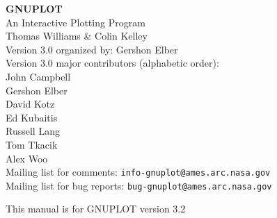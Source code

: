 %
%
\setlength{\textwidth}{6.25in}
\setlength{\oddsidemargin}{0.5cm}
\setlength{\topmargin}{-0.5in}
\setlength{\textheight}{9in}
\setlength{\parskip}{1ex}
\setlength{\parindent}{0pt}
\adjustarticle


\pagestyle{empty}
   \rule{0in}{3in}
   \begin{center}
   {\huge\bf GNUPLOT}\\
   \vspace{3ex}
   {\Large An Interactive Plotting Program}\\
   \vspace{2ex}
   \large
   Thomas Williams \& Colin Kelley\\
   \vspace{2ex}
   Version 3.0 organized by: Gershon Elber \\
   Version 3.0 major contributors (alphabetic order):\\
  John Campbell\\
  Gershon Elber\\
  David Kotz\\
  Ed Kubaitis\\
  Russell Lang\\
  Tom Tkacik\\
  Alex Woo\\

   \vspace{3ex}
   Mailing list for comments: \verb+info-gnuplot@ames.arc.nasa.gov+\\
   Mailing list for bug reports: \verb+bug-gnuplot@ames.arc.nasa.gov+

   \vfill
   {\small This manual is for GNUPLOT version 3.2}

   \end{center}
\newpage

\tableofcontents
\newpage

\setcounter{page}{1}
\pagestyle{myheadings}
